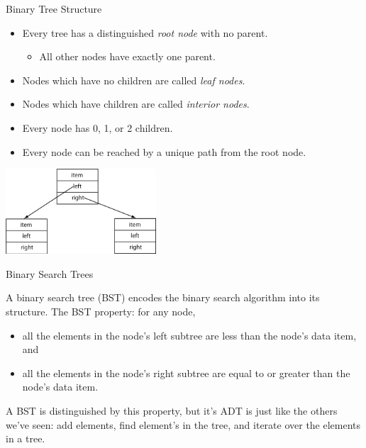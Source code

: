 \documentclass{beamer}
\begin{document}
\begin{frame}[fragile]{Binary Tree Structure}

\begin{itemize}
\item Every tree has a distinguished {\it root node} with no parent.
\begin{itemize}
\item All other nodes have exactly one parent.
\end{itemize}
\item Nodes which have no children are called {\it leaf nodes}.
\item Nodes which have children are called {\it interior nodes}.
\item Every node has 0, 1, or 2 children.
\item Every node can be reached by a unique path from the root node.
\end{itemize}

\begin{center}
\includegraphics[height=1.25in]{binary-tree.png}
\end{center}


\end{frame}

\begin{frame}[fragile]{Binary Search Trees}


A binary search tree (BST) encodes the binary search algorithm into its
structure.  The BST property: for any node,
\begin{itemize}
\item all the elements in the node's left subtree are less than the node's data item, and
\item all the elements in the node's right subtree are equal to or greater than the node's data item.
\end{itemize}

A BST is distinguished by this property, but it's ADT is just like the others we've seen: add elements, find element's in the tree, and iterate over the elements in a tree.


\end{frame}
\end{document}
